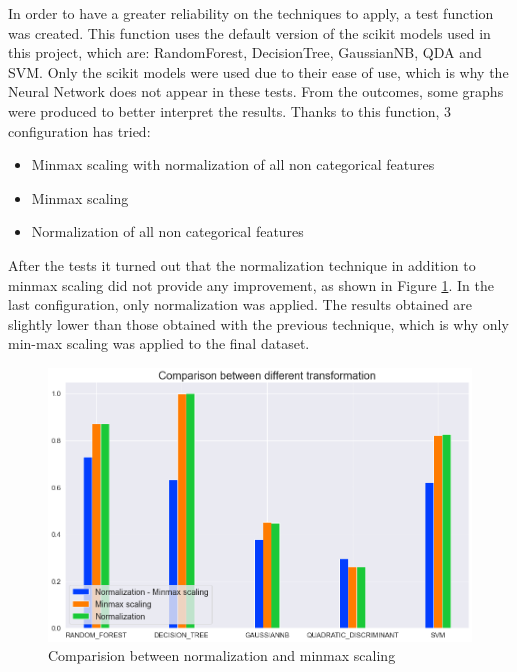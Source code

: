 \documentclass[../main]{subfiles}
\begin{document}
In order to have a greater reliability on the techniques to apply, a test function was created.
This function uses the default version of the scikit models used in this project, which are: RandomForest, DecisionTree, GaussianNB, QDA and SVM.
Only the scikit models were used due to their ease of use, which is why the Neural Network does not appear in these tests.
From the outcomes, some graphs were produced to better interpret the results.
Thanks to this function, 3 configuration has tried:
\begin{itemize}
    \item Minmax scaling with normalization of all non categorical features
    \item Minmax scaling
    \item Normalization of all non categorical features
\end{itemize}

After the tests it turned out that the normalization technique in addition to minmax scaling did not provide any improvement, as shown in Figure \ref{fig:plot_data_transformation}.
In the last configuration, only normalization was applied.
The results obtained are slightly lower than those obtained with the previous technique, which is why only min-max scaling was applied to the final dataset.
\begin{figure}[htb]
    \center
    \includegraphics[width=0.75\linewidth]{figures/data_transformation.png}    
    \caption{Comparision between normalization and minmax scaling}
    \label{fig:plot_data_transformation}
\end{figure}

\end{document}
